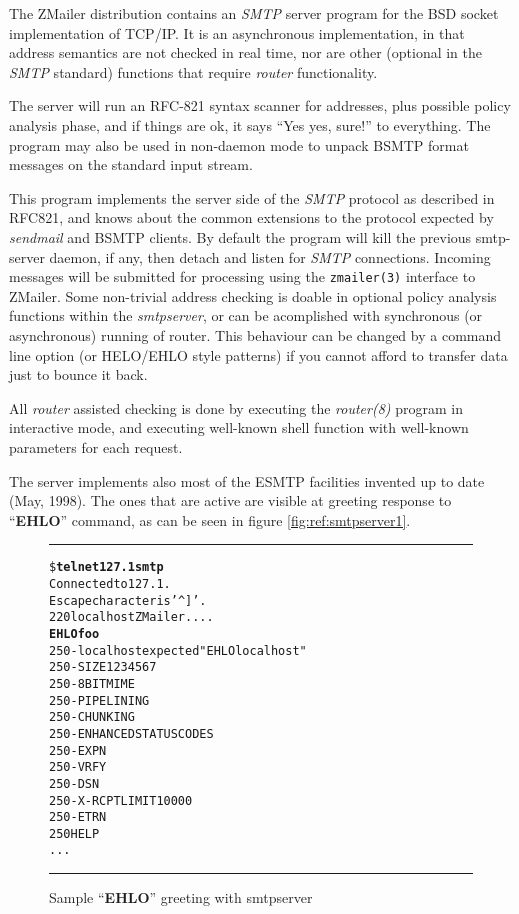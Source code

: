 

The ZMailer distribution contains an {\em SMTP} server program
for the BSD socket implementation of TCP/IP.
It is an asynchronous implementation, in that address semantics are
not checked in real time, nor are other (optional in the {\em SMTP}
standard) functions that require {\em router} functionality.

The server will run an RFC-821 syntax scanner for addresses, plus possible
policy analysis phase, and if things are ok, it says ``Yes yes, sure!'' to
everything.
The program may also be used in non-daemon mode to unpack BSMTP format
messages on the standard input stream.

This program implements the server side of the {\em SMTP} protocol
as described in RFC821, and knows about the common extensions to
the protocol expected by {\em sendmail} and BSMTP clients.
By default the program will kill the previous smtp-server daemon,
if any, then detach and listen for {\em SMTP} connections.
Incoming messages will be submitted for processing using the 
{\tt zmailer(3)} interface to ZMailer.
Some non-trivial address checking is doable in optional policy analysis
functions within the {\em smtpserver}, or can be acomplished with
synchronous (or asynchronous) running of router.
This behaviour can be changed by a command line option (or
HELO/EHLO style patterns) if you cannot afford to transfer
data just to bounce it back.

All {\em router} assisted checking is done by executing
the  {\em router(8)} program in interactive mode, and executing
well-known shell function with well-known parameters for each request.

The server implements also most of the ESMTP facilities invented
up to date (May, 1998).  The ones that are active are visible
at greeting response to ``{\bf EHLO}'' command, as can be seen
in figure \vref{fig:ref:smtpserver1}.

\begin{figure*}
\begin{alltt}\hrule\medskip
\$ {\bfseries{}telnet 127.1 smtp}
Connected to 127.1.
Escape character is '^]'.
220 localhost ZMailer ....
{\bfseries{}EHLO foo}
250-localhost expected "EHLO localhost"
250-SIZE 1234567
250-8BITMIME
250-PIPELINING
250-CHUNKING
250-ENHANCEDSTATUSCODES
250-EXPN
250-VRFY
250-DSN
250-X-RCPTLIMIT 10000
250-ETRN
250 HELP
...
\medskip\hrule\end{alltt}
\label{fig:ref:smtpserver1}
\caption{Sample ``{\bf EHLO}'' greeting with smtpserver}
\end{figure*}


